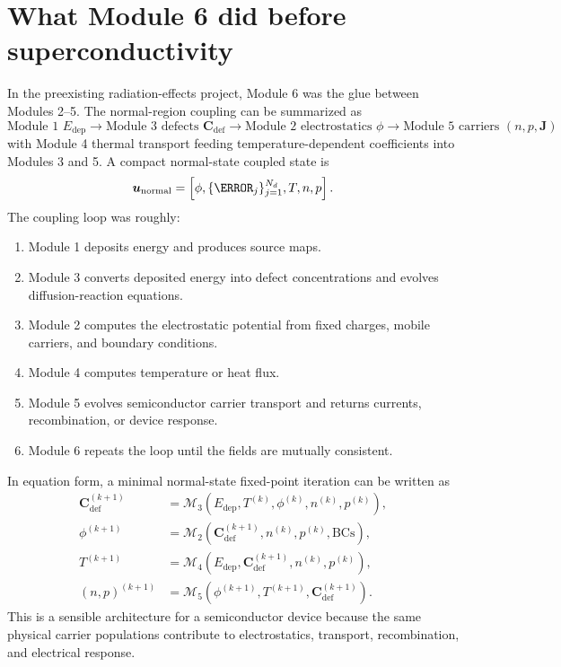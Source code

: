 \documentclass[11pt]{article}
\newcommand{\Edep}{E_{\mathrm{dep}}}
\newcommand{\phiE}{\phi}
\newcommand{\Jvec}{\bm{J}}
\newcommand{\Cvec}{\bm{C}_{\mathrm{def}}}
\newcommand{\state}{\bm{u}}
\newcommand{\Mtwo}{\mathcal{M}_2}
\newcommand{\Mthree}{\mathcal{M}_3}
\newcommand{\Mfour}{\mathcal{M}_4}
\newcommand{\Mfive}{\mathcal{M}_5}
\begin{document}
\section{What Module 6 did before superconductivity}

In the preexisting radiation-effects project, Module 6 was the glue between Modules 2--5. The normal-region coupling can be summarized as
\begin{equation}
\boxed{
\text{Module 1 }\Edep
\rightarrow
\text{Module 3 defects }\Cvec
\rightarrow
\text{Module 2 electrostatics }\phiE
\rightarrow
\text{Module 5 carriers }(n,p,\Jvec)
}
\end{equation}
with Module 4 thermal transport feeding temperature-dependent coefficients into Modules 3 and 5. A compact normal-state coupled state is
\begin{equation}
\state_{\mathrm{normal}}
=
\left[
\phiE,
\{\C_j\}_{j=1}^{N_d},
T,
 n,
 p
\right].
\end{equation}
The coupling loop was roughly:
\begin{enumerate}[leftmargin=2em]
\item Module 1 deposits energy and produces source maps.
\item Module 3 converts deposited energy into defect concentrations and evolves diffusion-reaction equations.
\item Module 2 computes the electrostatic potential from fixed charges, mobile carriers, and boundary conditions.
\item Module 4 computes temperature or heat flux.
\item Module 5 evolves semiconductor carrier transport and returns currents, recombination, or device response.
\item Module 6 repeats the loop until the fields are mutually consistent.
\end{enumerate}

In equation form, a minimal normal-state fixed-point iteration can be written as
\begin{align}
\Cvec^{(k+1)} &= \Mthree(\Edep,T^{(k)},\phiE^{(k)},n^{(k)},p^{(k)}),\\
\phiE^{(k+1)} &= \Mtwo(\Cvec^{(k+1)},n^{(k)},p^{(k)},\mathrm{BCs}),\\
T^{(k+1)} &= \Mfour(\Edep,\Cvec^{(k+1)},n^{(k)},p^{(k)}),\\
(n,p)^{(k+1)} &= \Mfive(\phiE^{(k+1)},T^{(k+1)},\Cvec^{(k+1)}).
\end{align}
This is a sensible architecture for a semiconductor device because the same physical carrier populations contribute to electrostatics, transport, recombination, and electrical response.
\end{document}
